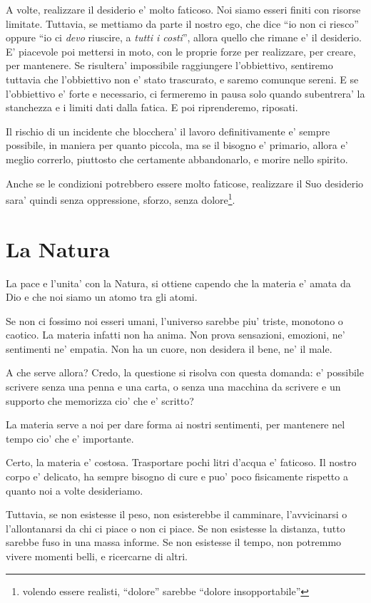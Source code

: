 A volte, realizzare il desiderio e' molto faticoso. Noi siamo esseri finiti con risorse limitate. Tuttavia, se mettiamo da parte il nostro ego, che dice ``io non ci riesco'' oppure ``io ci \emph{devo} riuscire, a \emph{tutti i costi}'', allora quello che rimane e' il desiderio. E' piacevole poi mettersi in moto, con le proprie forze per realizzare, per creare, per mantenere. Se risultera' impossibile raggiungere l'obbiettivo, sentiremo tuttavia che l'obbiettivo non e' stato trascurato, e saremo comunque sereni. E se l'obbiettivo e' forte e necessario, ci fermeremo in pausa solo quando subentrera' la stanchezza e i limiti dati dalla fatica. E poi riprenderemo, riposati.

Il rischio di un incidente che blocchera' il lavoro definitivamente e' sempre possibile, in maniera per quanto piccola, ma se il bisogno e' primario, allora e' meglio correrlo, piuttosto che certamente abbandonarlo, e morire nello spirito.

Anche se le condizioni potrebbero essere molto faticose, realizzare il Suo desiderio sara' quindi senza oppressione, sforzo, senza dolore\footnote{volendo essere realisti, ``dolore'' sarebbe ``dolore insopportabile''}.


\section{La Natura}
La pace e l'unita' con la Natura, si ottiene capendo che la materia e' amata da Dio e che noi siamo un atomo tra gli atomi.

Se non ci fossimo noi esseri umani, l'universo sarebbe piu' triste, monotono o caotico. La materia infatti non ha anima. Non prova sensazioni, emozioni, ne' sentimenti ne' empatia. Non ha un cuore, non desidera il bene, ne' il male.

A che serve allora? Credo, la questione si risolva con questa domanda: e' possibile scrivere senza una penna e una carta, o senza una macchina da scrivere e un supporto che memorizza cio' che e' scritto?

La materia serve a noi per dare forma ai nostri sentimenti, per mantenere nel tempo cio' che e' importante.

Certo, la materia e' costosa. Trasportare pochi litri d'acqua e' faticoso. Il nostro corpo e' delicato, ha sempre bisogno di cure e puo' poco fisicamente rispetto a quanto noi a volte desideriamo.

Tuttavia, se non esistesse il peso, non esisterebbe il camminare, l'avvicinarsi o l'allontanarsi da chi ci piace o non ci piace. Se non esistesse la distanza, tutto sarebbe fuso in una massa informe. Se non esistesse il tempo, non potremmo vivere momenti belli, e ricercarne di altri.

